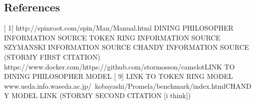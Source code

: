 \documentclass[12pt]{article}
\begin{document}
\begin{flushleft}
\section{References}
[ 1] http://spinroot.com/spin/Man/Manual.html \newline
[ 2] DINING PHILOSOPHER INFORMATION SOURCE \newline
[ 3] TOKEN RING INFORMATION SOURCE \newline
[ 4] SZYMANSKI INFORMATION SOURCE \newline
[ 5] CHANDY INFORMATION SOURCE (STORMY FIRST CITATION) \newline
[ 6] https://www.docker.com/\newline
[ 7] https://github.com/stormosson/camelot\newline
[ 8] LINK TO DINING PHILOSOPHER MODEL
[ 9] LINK TO TOKEN RING MODEL \newline
[10] www.ueda.info.waseda.ac.jp/~kobayashi/Promela/benchmark/index.html\newline
[11] CHANDY MODEL LINK (STORMY SECOND CITATION [i think])
\end{flushleft}
\end{document}
